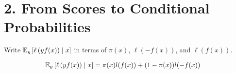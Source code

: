 \documentclass[12pt,letterpaper]{article}
\begin{document}
\newenvironment{solution}[2][Solution]{\begin{trivlist}
\item[\hskip \labelsep {\bfseries #1}]}{\end{trivlist}}
\newenvironment{problem}[2][Problem]{\begin{trivlist}
\item[\hskip \labelsep {\bfseries #1}\hskip \labelsep {\bfseries #2.}]}{\end{trivlist}}


\section*{2. From Scores to Conditional Probabilities}

\begin{problem}{2.1}
    Write $\mathbb{E}_{y}\left[\ell\left(yf(x)\right)\mid x\right]$ in terms
    of $\pi(x)$, $\ell(-f(x))$, and $\ell\left(f(x)\right)$.
\end{problem}
\begin{solution}{}
    \begin{align*}
        \mathbb{E}_{y}\left[\ell\left(yf(x)\right)\mid x\right] &= \pi(x)l(f(x)) + (1-\pi(x))l(-f(x))
    \end{align*}
\end{solution}
\end{document}
